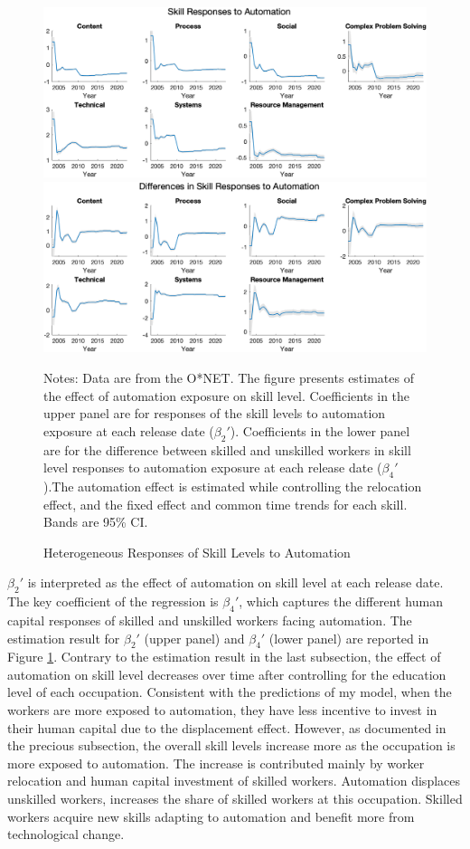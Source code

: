 \documentclass[12pt]{article}
\begin{document}
\begin{figure}[h!]
\includegraphics[width = \textwidth]{LV_group1} \\

\includegraphics[width = \textwidth]{LV_group3}
\caption{Heterogeneous Responses of Skill Levels to Automation}
\label{LV_group}
{\scriptsize Notes: Data are from the O*NET. The figure presents estimates of the effect of automation exposure on skill level. Coefficients in the upper panel are for responses of the skill levels to automation exposure at each release date ($\beta_2'$). Coefficients in the lower panel are for the difference between skilled and unskilled workers in skill level responses to automation exposure at each release date ($\beta_4'$).The automation effect is estimated while controlling the relocation effect, and the fixed effect and common time trends for each skill. Bands are 95\% CI.}
\end{figure}

$\beta_2'$ is interpreted as the effect of automation on skill level at each release date. The key coefficient of the regression is $\beta_4'$, which captures the different human capital responses of skilled and unskilled workers facing automation. The estimation result for $\beta_2'$ (upper panel) and $\beta_4'$ (lower panel) are reported in Figure \ref{LV_group}. Contrary to the estimation result in the last subsection, the effect of automation on skill level decreases over time after controlling for the education level of each occupation. Consistent with the predictions of my model, when the workers are more exposed to automation, they have less incentive to invest in their human capital due to the displacement effect. However, as documented in the precious subsection, the overall skill levels increase more as the occupation is more exposed to automation. The increase is contributed mainly by worker relocation and human capital investment of skilled workers. Automation displaces unskilled workers, increases the share of skilled workers at this occupation. Skilled workers acquire new skills adapting to automation and benefit more from technological change. 
\end{document}

